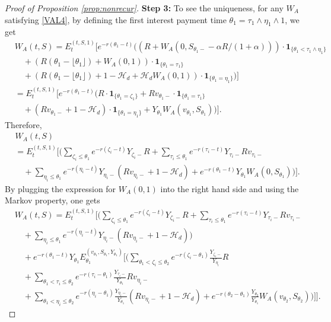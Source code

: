 \documentclass[11pt]{article}%
\numberwithin{equation}{section}
\theoremstyle{plain}
\begin{document}
\begin{appendices}
\begin{proof}[Proof of Proposition \ref{prop:nonrecur}]
	{\flushleft\bf Step 3:} To see the uniqueness, for any $W_A$ satisfying \eqref{VAL4}, by defining the first interest payment time $\theta_1=\tau_1\land\eta_1\land1$, we get
	\begin{align*}
	&W_A(t,S)=E_t^{(t,S,1)}\Bigg[e^{-r(\theta_1-t)}\Bigg((R+W_A(0,S_{\theta_1-}-\alpha R/(1+\alpha)))\cdot\mathbf{1}_{\{\theta_1<\tau_1\land\eta_1\}}\\
	&\quad+(R(\theta_1-\lfloor\theta_1\rfloor)+W_A(0,1))\cdot\mathbf{1}_{\{\theta_1=\tau_1\}}\\
	&\quad+(R(\theta_1-\lfloor\theta_1\rfloor)+1-\mathcal{H}_d+\mathcal{H}_d W_A(0,1))\cdot \mathbf{1}_{\{\theta_1=\eta_1\}}\Bigg)\Bigg]\\
	&=E_t^{(t,S,1)}\Bigg[e^{-r(\theta_1-t)}\Bigg(R\cdot\mathbf{1}_{\{\theta_1=\zeta_1\}}+Rv_{\theta_1-}\cdot\mathbf{1}_{\{\theta_1=\tau_1\}}\\
	&\quad+(Rv_{\theta_1-}+1-\mathcal{H}_d)\cdot \mathbf{1}_{\{\theta_1=\eta_1\}}+Y_{\theta_1} W_A(v_{\theta_1},S_{\theta_1})\Bigg)\Bigg].
	\end{align*}
	Therefore,
	\begin{align*}
	&W_A(t,S) \\
	&=E_t^{(t,S,1)}\Bigg[\Bigg(\sum_{\zeta_i\le\theta_1}e^{-r(\zeta_i-t)}Y_{\zeta_i-}R+\sum_{\tau_i\le\theta_1}e^{-r(\tau_i-t)}Y_{\tau_i-}Rv_{\tau_i-}\\
	&\quad+\sum_{\eta_i\le\theta_1}e^{-r(\eta_i-t)}Y_{\eta_i-}(Rv_{\eta_i-}+1-\mathcal{H}_d)+e^{-r(\theta_1-t)}Y_{\theta_1} W_A(0,S_{\theta_1})\Bigg)\Bigg].
	\end{align*}
	By plugging the expression for $W_A(0,1)$ into the right hand side and using the Markov property, one gets
	\begin{align*}
	&W_A(t,S)=E_t^{(t,S,1)}\Bigg[\Bigg(\sum_{\zeta_i\le\theta_1}e^{-r(\zeta_i-t)}Y_{\zeta_i-}R+\sum_{\tau_i\le\theta_1}e^{-r(\tau_i-t)}Y_{\tau_i-}Rv_{\tau_i-}\\
	&\quad+\sum_{\eta_i\le\theta_1}e^{-r(\eta_i-t)}Y_{\eta_i-}(Rv_{\eta_i-}+1-\mathcal{H}_d)\Bigg)\\
	&\quad+e^{-r(\theta_1-t)}Y_{\theta_1} E_{\theta_1}^{(v_{\theta_1},S_{\theta_1},Y_{\theta_1})}\Bigg[\Bigg(\sum_{\theta_1<\zeta_i\le\theta_2}e^{-r(\zeta_i-\theta_1)}\frac{Y_{\zeta_i-}}{Y_{\eta_i}}R   \\
	&\quad+\sum_{\theta_1<\tau_i\le\theta_2}e^{-r(\tau_i-\theta_1)}\frac{Y_{\tau_i-}}{Y_{\theta_1}}Rv_{\eta_i-}\\
	&\quad+\sum_{\theta_1<\eta_i\le\theta_2}e^{-r(\eta_i-\theta_1)}\frac{Y_{\eta_i-}}{Y_{\theta_1}}(Rv_{\eta_i-}+1-\mathcal{H}_d)+e^{-r(\theta_2-\theta_1)}\frac{Y_{\theta_2}}{Y_{\theta_1}} W_A(v_{\theta_2},S_{\theta_2})\Bigg)\Bigg]\Bigg].

\end{align*}
\end{proof}
\end{appendices}
\end{document}
